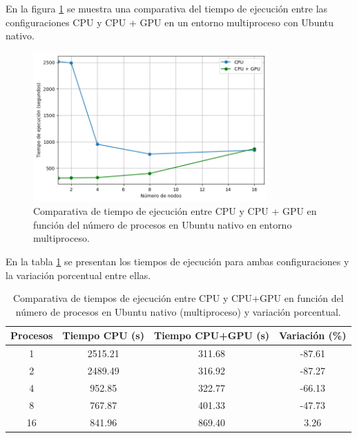 En la figura \ref{fig:multi-node_ubuntu_cpu_vs_gpu_native_time} se muestra una comparativa del tiempo de ejecución entre las configuraciones CPU y CPU + GPU en un entorno multiproceso con Ubuntu nativo.

\begin{figure}[ht]
    \centering
    \includegraphics[width=0.8\textwidth]{imagenes/cap5/multi-node_ubuntu_cpu_vs_gpu_native_time.png}
    \caption{Comparativa de tiempo de ejecución entre CPU y CPU + GPU en función del número de procesos en Ubuntu nativo en entorno multiproceso.}
    \label{fig:multi-node_ubuntu_cpu_vs_gpu_native_time}
\end{figure}

En la tabla \ref{tab:multi-node_ubuntu_cpu_vs_gpu_native} se presentan los tiempos de ejecución para ambas configuraciones y la variación porcentual entre ellas.

\begin{table}[ht]
    \centering
    \begin{tabular}{|c|c|c|c|}
        \hline
        \textbf{Procesos} & \textbf{Tiempo CPU (s)} & \textbf{Tiempo CPU+GPU (s)} & \textbf{Variación (\%)} \\
        \hline
        1                 & 2515.21                 & 311.68                      & -87.61                  \\
        2                 & 2489.49                 & 316.92                      & -87.27                  \\
        4                 & 952.85                  & 322.77                      & -66.13                  \\
        8                 & 767.87                  & 401.33                      & -47.73                  \\
        16                & 841.96                  & 869.40                      & 3.26                    \\
        \hline
    \end{tabular}
    \caption{Comparativa de tiempos de ejecución entre CPU y CPU+GPU en función del número de procesos en Ubuntu nativo (multiproceso) y variación porcentual.}
    \label{tab:multi-node_ubuntu_cpu_vs_gpu_native}
\end{table}

